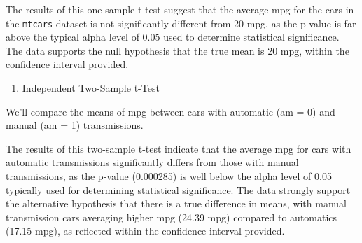 \documentclass[
]{book}
\newenvironment{Shaded}{\begin{snugshade}}{\end{snugshade}}
\newcommand{\AttributeTok}[1]{\textcolor[rgb]{0.13,0.29,0.53}{#1}}
\newcommand{\CommentTok}[1]{\textcolor[rgb]{0.56,0.35,0.01}{\textit{#1}}}
\newcommand{\ConstantTok}[1]{\textcolor[rgb]{0.56,0.35,0.01}{#1}}
\newcommand{\DecValTok}[1]{\textcolor[rgb]{0.00,0.00,0.81}{#1}}
\newcommand{\FunctionTok}[1]{\textcolor[rgb]{0.13,0.29,0.53}{\textbf{#1}}}
\newcommand{\NormalTok}[1]{#1}
\newcommand{\OtherTok}[1]{\textcolor[rgb]{0.56,0.35,0.01}{#1}}
\newcommand{\SpecialCharTok}[1]{\textcolor[rgb]{0.81,0.36,0.00}{\textbf{#1}}}
\providecommand{\tightlist}{%
  \setlength{\itemsep}{0pt}\setlength{\parskip}{0pt}}
\begin{document}
The results of this one-sample t-test suggest that the average mpg for the cars in the \texttt{mtcars} dataset is not significantly different from 20 mpg, as the p-value is far above the typical alpha level of 0.05 used to determine statistical significance. The data supports the null hypothesis that the true mean is 20 mpg, within the confidence interval provided.

\begin{enumerate}
\def\labelenumi{\alph{enumi}.}
\setcounter{enumi}{1}
\tightlist
\item
  Independent Two-Sample t-Test
\end{enumerate}

We'll compare the means of mpg between cars with automatic (am = 0) and manual (am = 1) transmissions.

\begin{Shaded}
\end{Shaded}

The results of this two-sample t-test indicate that the average mpg for cars with automatic transmissions significantly differs from those with manual transmissions, as the p-value (0.000285) is well below the alpha level of 0.05 typically used for determining statistical significance. The data strongly support the alternative hypothesis that there is a true difference in means, with manual transmission cars averaging higher mpg (24.39 mpg) compared to automatics (17.15 mpg), as reflected within the confidence interval provided.
\end{document}
